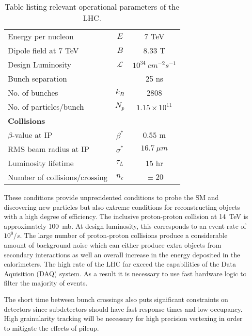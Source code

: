 \begin{table}
\begin{center}
\begin{tabular}{l|c|c}
\hline 
\hline
Energy per nucleon           & $E$           & 7 TeV    \\
Dipole field at 7 TeV        & $B$           & 8.33 T   \\
Design Luminosity            & $\mathscr{L}$ & $10^{34}~cm^{-2}s^{-1}$\\
Bunch separation             &               & 25 ns    \\
No. of bunches               & $k_B$         & 2808      \\
No. of particles/bunch       & $N_p$         & $1.15\times 10^{11}$\\ \hline
\multicolumn{3}{l}{{\bf Collisions}} \\ \hline
$\beta$-value at IP          & $\beta^*$     & 0.55 m   \\
RMS beam radius at IP        & $\sigma^*$    & $16.7~\mu m$  \\
Luminosity lifetime          & $\tau_L$      & 15 hr         \\
Number of collisions/crossing& $n_c$         & $\equiv20$      \\
\hline 
\hline
\end{tabular}
\label{table:LHCparameters}
\caption{Table listing relevant operational parameters of the LHC.}
\end{center}
\end{table}

These conditions provide unprecidented conditions to probe the SM and 
discovering new particles but also extreme conditions for reconstructing
objects with a high degree of efficiency.  
The inclusive proton-proton
collision at 14~TeV is approximately 100~mb.  At design luminosity, this
corresponds to an event rate of $10^9/s$.  
The large number of proton-proton
collisions produce a considerable amount of background noise which can 
either produce extra objects from secondary interactions as well an overall
increase in the energy deposited in the calorimeters.  The  high rate of the 
LHC far exceed the capabilities of the Data Aquisition (DAQ) system.  As a 
result it is necessary to use fast hardware logic to filter the majority of 
events. 

The short time between bunch crossings also puts significant constraints on 
detectors since subdetectors should have fast response times and low occupancy. 
High grainularity tracking will be necessary for high precision vertexing in
order to mitigate the effects of pileup.

